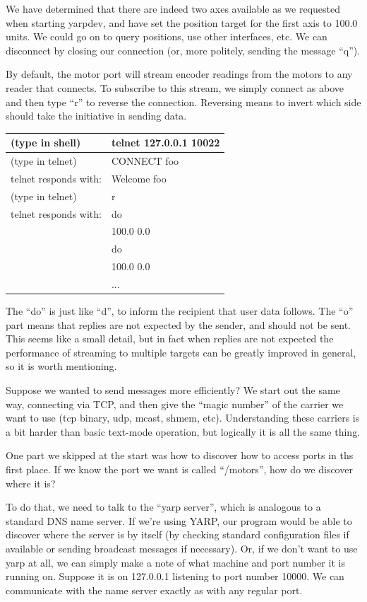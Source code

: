 We have determined that there are indeed two axes available as we requested
when starting yarpdev, and have set the position target for the
first axis to 100.0 units.  We could go on to query positions, use
other interfaces, etc.  We can disconnect by closing our connection
(or, more politely, sending the message ``q'').

By default, the motor port will stream encoder readings from the motors
to any reader that connects.  To subscribe to this stream, we simply
connect as above and then type ``r'' to reverse the connection.
Reversing means to invert which side should take the initiative
in sending data.


\begin{tabular}{|l|l|}
\hline
(type in shell) & telnet 127.0.0.1 10022 \\
\hline
(type in telnet) & CONNECT foo \\
\hline
telnet responds with: & Welcome foo \\
\hline
(type in telnet) & r \\
\hline
telnet responds with: & do \\
\hline
 & 100.0 0.0 \\
\hline
 & do \\
\hline
 & 100.0 0.0 \\
\hline
 & ... \\
\hline
\end{tabular}

The ``do'' is just like ``d'', to inform the recipient that user data
follows.  The ``o'' part means that replies are not expected by the
sender, and should not be sent.  This seems like a small detail,
but in fact when replies are not expected the performance of 
streaming to multiple targets can be greatly improved in general,
so it is worth mentioning.

Suppose we wanted to send messages more efficiently?  We start out the
same way, connecting via TCP, and then give the ``magic number'' of
the carrier we want to use (tcp binary, udp, mcast, shmem, etc).
Understanding these carriers is a bit harder than basic text-mode operation,
but logically it is all the same thing.

One part we skipped at the start was how to discover how to 
access ports in ths first place.  If we know the port we want
is called ``/motors'', how do we discover where it is?

To do that, we need to talk to the ``yarp server'', which is analogous
to a standard DNS name server.  If we're using YARP, our program would
be able to discover where the server is by itself (by checking
standard configuration files if available or sending broadcast
messages if necessary).  Or, if we don't want to use yarp at all, we
can simply make a note of what machine and port number it is running
on.  Suppose it is on 127.0.0.1 listening to port number 10000.
We can communicate with the name server exactly as with any regular
port.

